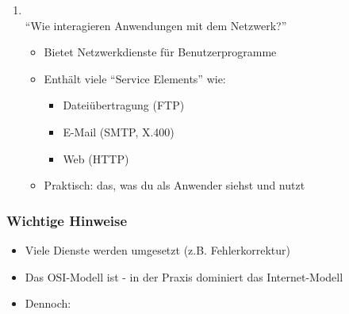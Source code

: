 \begin{enumerate}
\begin{itemize}
        \item Syntaxvereinheitlichung
        \item {} möglich
        \item {} ASN.1, BER, google Protobuf
        \item In modernen Netzwerken oft Teil der Anwendungsschicht
    \end{itemize}
    \item {}\\
    \enquote{Wie interagieren Anwendungen mit dem Netzwerk?}
    \begin{itemize}
        \item Bietet Netzwerkdienste für Benutzerprogramme
        \item Enthält viele \enquote{Service Elements} wie:
        \begin{itemize}
            \item Dateiübertragung (FTP)
            \item E-Mail (SMTP, X.400)
            \item Web (HTTP)
        \end{itemize}
        \item Praktisch: das, was du als Anwender siehst und nutzt
    \end{itemize} 
\end{enumerate}
\subsubsection*{Wichtige Hinweise}
\begin{itemize}
    \item Viele Dienste werden  umgesetzt (z.B. Fehlerkorrektur)
    \item Das OSI-Modell ist  - in der Praxis dominiert das Internet-Modell
    \item Dennoch: 
\end{itemize}
